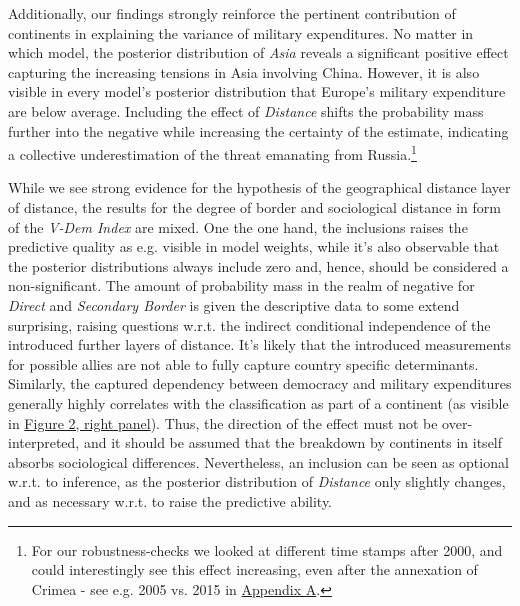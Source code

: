 \documentclass[12pt,a4paper]{article}
\begin{document}
Additionally, our findings strongly reinforce the pertinent contribution of continents in explaining the variance of military expenditures. No matter in which model, the posterior distribution of \textit{Asia} reveals a significant positive effect capturing the increasing tensions in Asia involving China. However, it is also visible in every model's posterior distribution that Europe's military expenditure are below average. Including the effect of \textit{Distance} shifts the probability mass further into the negative while increasing the certainty of the estimate, indicating a collective underestimation of the threat emanating from Russia.\footnote{For our robustness-checks we looked at different time stamps after 2000, and could interestingly see this effect increasing, even after the annexation of Crimea - see e.g. 2005 vs. 2015 in \hyperref[Appendix Tables]{\color{blue}Appendix A}.}


While we see strong evidence for the hypothesis of the geographical distance layer of distance, the results for the degree of border and sociological distance in form of the \textit{V-Dem Index} are mixed. One the one hand, the inclusions raises the predictive quality as e.g. visible in model weights, while it's also observable that the posterior distributions always include zero and, hence, should be considered a non-significant. The amount of probability mass in the realm of negative for \textit{Direct} and \textit{Secondary Border }is given the descriptive data to some extend surprising, raising questions w.r.t. the indirect conditional independence of the introduced further layers of distance. It's likely that the introduced measurements for possible allies are not able to fully capture country specific determinants. Similarly, the captured dependency between democracy and military expenditures generally highly correlates with the classification as part of a continent (as visible in \hyperref[F:2]{\color{blue}Figure 2, right panel}). Thus,  the direction of the effect must not be over-interpreted, and it should be assumed that the breakdown by continents in itself absorbs sociological differences. Nevertheless, an inclusion can be seen as optional w.r.t. to inference, as the posterior distribution of \textit{Distance} only slightly changes, and as necessary w.r.t. to raise the predictive ability. 
\end{document}
